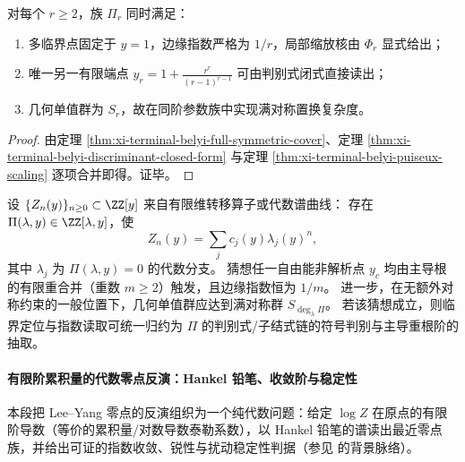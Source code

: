 \begin{corollary}\label{cor:xi-terminal-belyi-adjustable-exponent-maximal-galois}
对每个 \(r\ge2\)，族 \(\Pi_r\) 同时满足：
\begin{enumerate}
  \item 多临界点固定于 \(y=1\)，边缘指数严格为 \(1/r\)，局部缩放核由 \(\Phi_r\) 显式给出；
  \item 唯一另一有限端点 \(y_r=1+\frac{r^r}{(r-1)^{r-1}}\) 可由判别式闭式直接读出；
  \item 几何单值群为 \(S_r\)，故在同阶参数族中实现满对称置换复杂度。
\end{enumerate}
\end{corollary}
\begin{proof}
由定理 \ref{thm:xi-terminal-belyi-full-symmetric-cover}、定理 \ref{thm:xi-terminal-belyi-discriminant-closed-form} 与定理 \ref{thm:xi-terminal-belyi-puiseux-scaling} 逐项合并即得。证毕。
\end{proof}

\begin{conjecture}\label{conj:xi-terminal-algebraic-spectrum-integer-puiseux-principle}
设 \(\{Z_n(y)\}_{n\ge0}\subset\ZZ[y]\) 来自有限维转移算子或代数谱曲线：
存在 \(\Pi(\lambda,y)\in\ZZ[\lambda,y]\)，使
\[
Z_n(y)=\sum_j c_j(y)\lambda_j(y)^n,
\]
其中 \(\lambda_j\) 为 \(\Pi(\lambda,y)=0\) 的代数分支。
猜想任一自由能非解析点 \(y_c\) 均由主导根的有限重合并（重数 \(m\ge2\)）触发，且边缘指数恒为 \(1/m\)。
进一步，在无额外对称约束的一般位置下，几何单值群应达到满对称群 \(S_{\deg_\lambda\Pi}\)。
若该猜想成立，则临界定位与指数读取可统一归约为 \(\Pi\) 的判别式/子结式链的符号判别与主导重根阶的抽取。
\end{conjecture}





\paragraph{有限阶累积量的代数零点反演：Hankel 铅笔、收敛阶与稳定性}
本段把 Lee--Yang 零点的反演组织为一个纯代数问题：给定 \(\log Z\) 在原点的有限阶导数（等价的累积量/对数导数泰勒系数），以 Hankel 铅笔的谱读出最近零点族，并给出可证的指数收敛、锐性与扰动稳定性判据（参见 \cite{LeeYang1952LatticeGasIsing,FlindtGarrahan2013Trajectory} 的背景脉络）。

